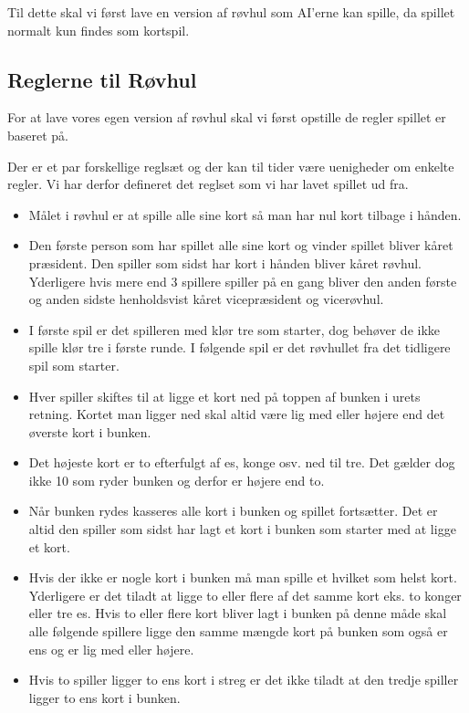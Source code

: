 \documentclass[a4paper, 12pt]{article}
\begin{document}
Til dette skal vi først lave en version af røvhul som AI'erne kan spille, da spillet normalt kun findes som kortspil. 

\subsection{Reglerne til Røvhul}
For at lave vores egen version af røvhul skal vi først opstille de regler spillet er baseret på.

Der er et par forskellige reglsæt og der kan til tider være uenigheder om enkelte regler. Vi har derfor defineret det reglset som vi har lavet spillet ud fra.

\begin{itemize}
	\item Målet i røvhul er at spille alle sine kort så man har nul kort tilbage i hånden.
	\item Den første person som har spillet alle sine kort og vinder spillet bliver kåret præsident. Den spiller som sidst har kort i hånden bliver kåret røvhul. Yderligere hvis mere end 3 spillere spiller på en gang bliver den anden første og anden sidste henholdsvist kåret vicepræsident og vicerøvhul.
	\item I første spil er det spilleren med klør tre som starter, dog behøver de ikke spille klør tre i første runde. I følgende spil er det røvhullet fra det tidligere spil som starter.
	\item Hver spiller skiftes til at ligge et kort ned på toppen af bunken i urets retning. Kortet man ligger ned skal altid være lig med eller højere end det øverste kort i bunken. 
	\item Det højeste kort er to efterfulgt af es, konge osv. ned til tre. Det gælder dog ikke 10 som ryder bunken og derfor er højere end to.
	\item Når bunken rydes kasseres alle kort i bunken og spillet fortsætter. Det er altid den spiller som sidst har lagt et kort i bunken som starter med at ligge et kort.
	\item Hvis der ikke er nogle kort i bunken må man spille et hvilket som helst kort. Yderligere er det tiladt at ligge to eller flere af det samme kort eks. to konger eller tre es. Hvis to eller flere kort bliver lagt i bunken på denne måde skal alle følgende spillere ligge den samme mængde kort på bunken som også er ens og er lig med eller højere.
	\item Hvis to spiller ligger to ens kort i streg er det ikke tiladt at den tredje spiller ligger to ens kort i bunken.

\end{itemize}
\end{document}
